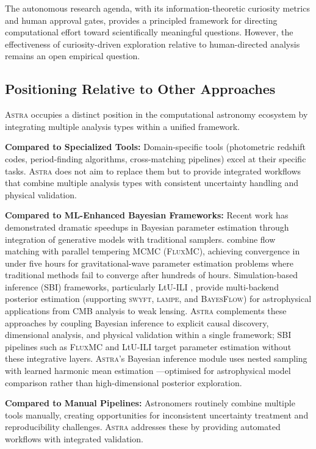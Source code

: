 \documentclass[usenatbib]{rasti}
\newcommand{\astra}{\textsc{Astra}\xspace}
\begin{document}
The autonomous research agenda, with its information-theoretic curiosity metrics and human approval gates, provides a principled framework for directing computational effort toward scientifically meaningful questions.
However, the effectiveness of curiosity-driven exploration relative to human-directed analysis remains an open empirical question.

\subsection{Positioning Relative to Other Approaches}
\label{sec:discussion:positioning}

\astra occupies a distinct position in the computational astronomy ecosystem by integrating multiple analysis types within a unified framework.

\textbf{Compared to Specialized Tools:}
Domain-specific tools (photometric redshift codes, period-finding algorithms, cross-matching pipelines) excel at their specific tasks.
\astra does not aim to replace them but to provide integrated workflows that combine multiple analysis types with consistent uncertainty handling and physical validation.

\textbf{Compared to ML-Enhanced Bayesian Frameworks:}
Recent work has demonstrated dramatic speedups in Bayesian parameter estimation through integration of generative models with traditional samplers.
\citet{Liang2026} combine flow matching with parallel tempering MCMC (\textsc{FluxMC}), achieving convergence in under five hours for gravitational-wave parameter estimation problems where traditional methods fail to converge after hundreds of hours.
Simulation-based inference (SBI) frameworks, particularly LtU-ILI \citep{Cranmer2024}, provide multi-backend posterior estimation (supporting \textsc{swyft}, \textsc{lampe}, and \textsc{BayesFlow}) for astrophysical applications from CMB analysis to weak lensing.
\astra complements these approaches by coupling Bayesian inference to explicit causal discovery, dimensional analysis, and physical validation within a single framework; SBI pipelines such as \textsc{FluxMC} and LtU-ILI target parameter estimation without these integrative layers.
\astra's Bayesian inference module uses nested sampling with learned harmonic mean estimation \citep{SpurioMancini+2023}---optimised for astrophysical model comparison rather than high-dimensional posterior exploration.

\textbf{Compared to Manual Pipelines:}
Astronomers routinely combine multiple tools manually, creating opportunities for inconsistent uncertainty treatment and reproducibility challenges.
\astra addresses these by providing automated workflows with integrated validation.
\end{document}
